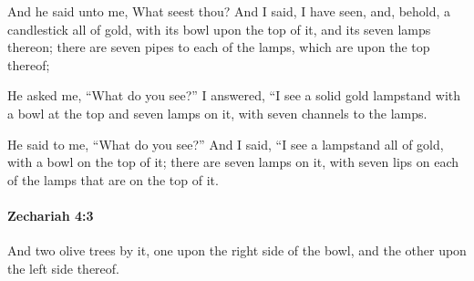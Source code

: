 			\begin{versebox}
					\item[BHS] 
					\item[LXX] 
					\item[ASV] And he said unto me, What seest thou? And I said, I have seen, and, behold, a candlestick all of gold, with its bowl upon the top of it, and its seven lamps thereon; there are seven pipes to each of the lamps, which are upon the top thereof;
					\item[NIV] He asked me, “What do you see?” I answered, “I see a solid gold lampstand with a bowl at the top and seven lamps on it, with seven channels to the lamps.
					\item[NRSV] He said to me, “What do you see?” And I said, “I see a lampstand all of gold, with a bowl on the top of it; there are seven lamps on it, with seven lips on each of the lamps that are on the top of it.
			\end{versebox}

		\paragraph{Zechariah 4:3} %
			\label{ZECHARIAH-4-3}

			And two olive trees by it, one upon the right side of the bowl, and the other upon the left side thereof.

